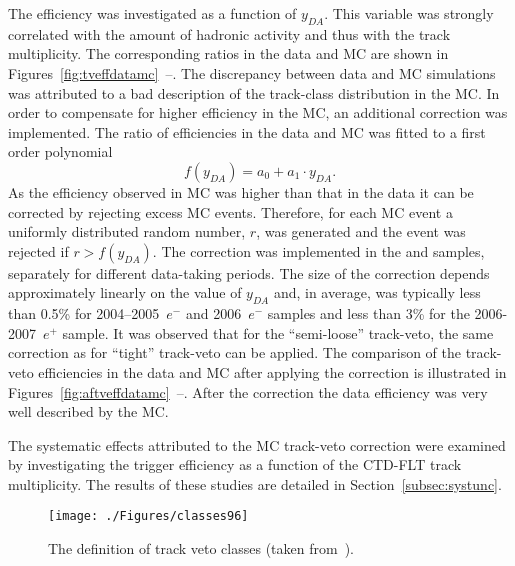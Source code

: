 The efficiency was investigated as a function of $y_{DA}$. This variable was strongly correlated with the amount of hadronic activity and thus with the track multiplicity. The corresponding ratios in the data and MC are shown in Figures~\ref{fig:tveffdatamc}~--. The discrepancy between data and MC simulations was attributed to a bad description of the track-class distribution in the MC. In order to compensate for higher efficiency in the MC, an additional correction was implemented. The ratio of efficiencies in the data and MC was fitted to a first order polynomial
\begin{equation} 
 f\left(y_{DA}\right)=a_0 + a_1 \cdot y_{DA}.
\end{equation}
As the efficiency observed in MC was higher than that in the data it can be corrected by rejecting excess MC events. Therefore, for each MC event a uniformly distributed random number, $r$, was generated and the event was rejected if $r > f\left(y_{DA}\right)$. The correction was implemented in the \lepto and \ariadne samples, separately for different data-taking periods. The size of the correction depends approximately linearly on the value of $y_{DA}$ and, in average, was typically less than 0.5\% for 2004--2005~$e^-$ and 2006~$e^-$ samples and less than 3\% for the 2006-2007~$e^+$ sample. It was observed that for the ``semi-loose'' track-veto, the same correction as for ``tight'' track-veto can be applied. The comparison of the track-veto efficiencies in the data and MC after applying the correction is illustrated in Figures~\ref{fig:aftveffdatamc}~--. After the correction the data efficiency was very well described by the MC. 

The systematic effects attributed to the MC track-veto correction were examined by investigating the trigger efficiency as a function of the CTD-FLT track multiplicity. The results of these studies are detailed in Section~\ref{subsec:systunc}.
\begin{figure}[t]
  \begin{center}
    \texttt{[image: ./Figures/classes96]}
  \end{center}
  \caption{The definition of track veto classes (taken from~\protect\cite{YamazakiSite}).}
  \label{fig:trackvetodefinition}
\end{figure}


